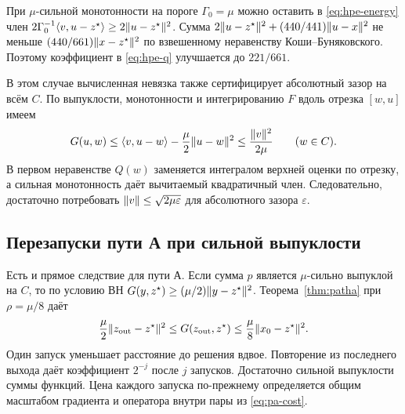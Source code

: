 При $\mu$-сильной монотонности на пороге $\Gamma_0=\mu$ можно
оставить в \eqref{eq:hpe-energy} член
$2\Gamma_0^{-1}\langle v,u-z^\star\rangle\ge2\lVert u-z^\star\rVert^2$.
Сумма $2\lVert u-z^\star\rVert^2+(440/441)\lVert u-x\rVert^2$ не меньше
$(440/661)\lVert x-z^\star\rVert^2$ по взвешенному неравенству
Коши--Буняковского. Поэтому коэффициент в \eqref{eq:hpe-q}
улучшается до $221/661$.

В этом случае вычисленная невязка также сертифицирует
абсолютный зазор на всём $C$. По выпуклости, монотонности
и интегрированию $F$ вдоль отрезка $[w,u]$ имеем
\[
 G(u,w)\le \langle v,u-w\rangle-\frac\mu2\lVert u-w\rVert^2
          \le\frac{\lVert v\rVert^2}{2\mu}\qquad(w\in C).
\]
В первом неравенстве $Q(w)$ заменяется интегралом верхней оценки
по отрезку, а сильная монотонность даёт вычитаемый квадратичный
член. Следовательно, достаточно потребовать
$\lVert v\rVert\le\sqrt{2\mu\varepsilon}$ для абсолютного зазора
$\varepsilon$.

\subsection{Перезапуски пути А при сильной выпуклости}

Есть и прямое следствие для пути А. Если сумма $p$ является
$\mu$-сильно выпуклой на $C$, то по условию ВН
$G(y,z^\star)\ge(\mu/2)\lVert y-z^\star\rVert^2$.
Теорема~\ref{thm:patha} при $\rho=\mu/8$ даёт
\[
 \frac\mu2\lVert z_{\rm out}-z^\star\rVert^2
 \le G(z_{\rm out},z^\star)
 \le\frac\mu8\lVert x_0-z^\star\rVert^2 .
\]
Один запуск уменьшает расстояние до решения вдвое.
Повторение из последнего выхода даёт коэффициент $2^{-j}$
после $j$ запусков. Достаточно сильной выпуклости суммы функций.
Цена каждого запуска по-прежнему определяется общим масштабом
градиента и оператора внутри пары из \eqref{eq:pa-cost}.
